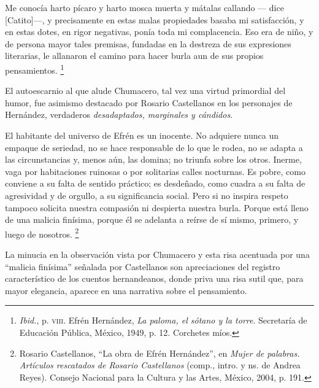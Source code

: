 \documentclass[14pt,twoside,final]{extbook} %
\let\oldfootnote\footnote
\renewcommand\footnote[1]{%
\oldfootnote{\hspace{1mm}#1}}
\begin{document}
\begin{quoting}
Me conocía harto pícaro y harto mosca muerta y mátalas callando --- dice [Catito]---, y precisamente en estas malas propiedades basaba mi satisfacción, y en estas dotes, en rigor negativas, ponía toda mi complacencia. Eso era de niño, y de persona mayor tales premisas, fundadas en la destreza de sus expresiones literarias, le allanaron el camino para hacer burla aun de sus propios pensamientos.\footnote{\emph{Ibid.}, p. \textsc{viii}. Efrén Hernández, \emph{La paloma, el sótano y la torre}. Secretaría de Educación Pública, México, 1949, p. 12. Corchetes míos.}
\end{quoting}
El autoescarnio al que alude Chumacero, tal vez una virtud primordial del humor, fue asimismo destacado por Rosario Castellanos en los personajes de Hernández, verdaderos \emph{desadaptados, marginales y cándidos}.
\begin{quoting}
El habitante del universo de Efrén es un inocente. No adquiere nunca un empaque de seriedad, no se hace responsable de lo que le rodea, no se adapta a las circunstancias y, menos aún, las domina; no
triunfa sobre los otros. Inerme, vaga por habitaciones ruinosas o por solitarias calles nocturnas. Es pobre, como conviene a su falta de sentido práctico; es desdeñado, como cuadra a su falta de agresividad y de orgullo, a su significancia social. Pero si no inspira respeto tampoco solicita nuestra compasión ni despierta nuestra burla. Porque está lleno de una malicia finísima, porque él se
adelanta a reírse de sí mismo, primero, y luego de nosotros.\footnote{Rosario Castellanos, ``La obra de Efrén Hernández'', en \emph{Mujer de palabras. Artículos rescatados de Rosario Castellanos} (comp., intro. y ns. de Andrea Reyes). Consejo Nacional para la Cultura y las Artes, México,
2004, p. 191.}
\end{quoting}
La minucia en la observación vista por Chumacero y esta risa acentuada por una ``malicia finísima'' señalada por Castellanos son apreciaciones del registro característico de los cuentos hernandeanos, donde priva una risa sutil que, para mayor elegancia, aparece en una narrativa sobre el pensamiento.
\end{document}
